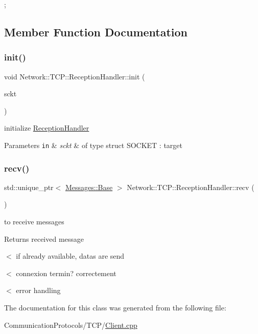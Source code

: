 ; 

\subsection{Member Function Documentation}
\mbox{\label{class_network_1_1_t_c_p_1_1_reception_handler_a2c14a1b0489719aaa194daf67f2bf47f}} 
\subsubsection{\texorpdfstring{init()}{init()}}
{\footnotesize\ttfamily void Network\+::\+T\+C\+P\+::\+Reception\+Handler\+::init (\begin{DoxyParamCaption}\item[{S\+O\+C\+K\+ET}]{sckt }\end{DoxyParamCaption})}



initialize \hyperlink{class_network_1_1_t_c_p_1_1_reception_handler}{Reception\+Handler} 


\begin{DoxyParams}[1]{Parameters}
\mbox{\tt in}  & {\em sckt} & of type struct S\+O\+C\+K\+ET \+: target \\
\hline
\end{DoxyParams}
\mbox{\label{class_network_1_1_t_c_p_1_1_reception_handler_a2b872cdd7bd5ac78f8b7a6d2c3380289}} 
\subsubsection{\texorpdfstring{recv()}{recv()}}
{\footnotesize\ttfamily std\+::unique\+\_\+ptr$<$ \hyperlink{class_network_1_1_messages_1_1_base}{Messages\+::\+Base} $>$ Network\+::\+T\+C\+P\+::\+Reception\+Handler\+::recv (\begin{DoxyParamCaption}{ }\end{DoxyParamCaption})}



to receive messages 

\begin{DoxyReturn}{Returns}
received message 
\end{DoxyReturn}
$<$ if already available, datas are send

$<$ connexion termin? correctement

$<$ error handling 

The documentation for this class was generated from the following file\+:\begin{DoxyCompactItemize}
\item 
Communication\+Protocols/\+T\+C\+P/\hyperlink{_client_8cpp}{Client.\+cpp}\end{DoxyCompactItemize}
